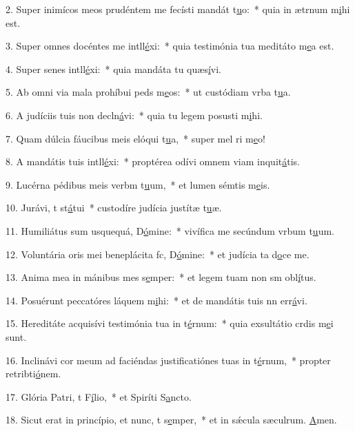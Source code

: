 2. Super inimícos meos prudéntem me fecísti mandát t\uline{u}o:~* quia in ætrnum m\uline{i}hi est.\par 
3. Super omnes docéntes me intll\uline{é}xi:~* quia testimónia tua meditáto m\uline{e}a est.\par 
4. Super senes intll\uline{é}xi:~* quia mandáta tu quæs\uline{í}vi.\par 
5. Ab omni via mala prohíbui peds m\uline{e}os:~* ut custódiam vrba t\uline{u}a.\par 
6. A judíciis tuis non decln\uline{á}vi:~* quia tu legem posusti m\uline{i}hi.\par 
7. Quam dúlcia fáucibus meis elóqui t\uline{u}a,~* super mel ri m\uline{e}o!\par 
8. A mandátis tuis intll\uline{é}xi:~* proptérea odívi omnem viam inquit\uline{á}tis.\par 
9. Lucérna pédibus meis verbm t\uline{u}um,~* et lumen sémtis m\uline{e}is.\par 
10. Jurávi, t st\uline{á}tui~* custodíre judícia justítæ t\uline{u}æ.\par 
11. Humiliátus sum usquequá, D\uline{ó}mine:~* vivífica me secúndum vrbum t\uline{u}um.\par 
12. Voluntária oris mei beneplácita fc, D\uline{ó}mine:~* et judícia ta d\uline{o}ce me.\par 
13. Anima mea in mánibus mes s\uline{e}mper:~* et legem tuam non sm obl\uline{í}tus.\par 
14. Posuérunt peccatóres láquem m\uline{i}hi:~* et de mandátis tuis nn err\uline{á}vi.\par 
15. Hereditáte acquisívi testimónia tua in t\uline{é}rnum:~* quia exsultátio crdis m\uline{e}i sunt.\par 
16. Inclinávi cor meum ad faciéndas justificatiónes tuas in t\uline{é}rnum,~* propter retribti\uline{ó}nem.\par 
17. Glória Patri, t F\uline{í}lio,~* et Spiríti S\uline{a}ncto.\par 
18. Sicut erat in princípio, et nunc, t s\uline{e}mper,~* et in sǽcula sæculrum. \uline{A}men.\par 
